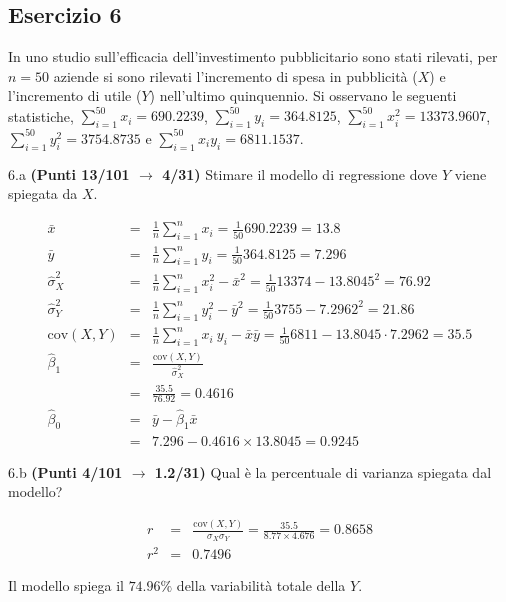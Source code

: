 \documentclass[
  11pt,
]{book}
\theoremstyle{mytheoremstyle}
\theoremstyle{mydefstyle}
\newenvironment{sol}
  {
  \begin{tcolorbox}[enhanced,breakable,arc=0.1mm,boxrule=1pt,colback=white,colframe=iblue,
  title=\bf \fontfamily{lmss}\selectfont \hspace{.5 cm} Soluzione,drop fuzzy shadow]

}{
\end{tcolorbox}
  }
\begin{document}
\subsection{Esercizio 6}\label{esercizio-6-24}

In uno studio sull'efficacia dell'investimento pubblicitario sono stati rilevati, per \(n=50\) aziende si sono rilevati l'incremento di spesa in
pubblicità (\(X\)) e l'incremento di utile (\(Y\)) nell'ultimo quinquennio. Si osservano le seguenti statistiche, \(\sum_{i=1}^{50}x_i=690.2239\), \(\sum_{i=1}^{50}y_i=364.8125\),
\(\sum_{i=1}^{50}x_i^2=13373.9607\), \(\sum_{i=1}^{50}y_i^2=3754.8735\) e \(\sum_{i=1}^{50}x_iy_i=6811.1537\).

6.a \textbf{(Punti 13/101 \(\rightarrow\) 4/31)} Stimare il modello di regressione dove \(Y\) viene spiegata da \(X\).

\begin{sol}
\begin{eqnarray*}
           \bar x &=&\frac 1 n\sum_{i=1}^n x_i = \frac {1}{ 50 }  690.2239 =  13.8 \\
           \bar y &=&\frac 1 n\sum_{i=1}^n y_i = \frac {1}{ 50 }  364.8125 =  7.296 \\
           \hat\sigma_X^2&=&\frac 1 n\sum_{i=1}^n x_i^2-\bar x^2=\frac {1}{ 50 }  13374  - 13.8045 ^2= 76.92 \\
           \hat\sigma_Y^2&=&\frac 1 n\sum_{i=1}^n y_i^2-\bar y^2=\frac {1}{ 50 }  3755  - 7.2962 ^2= 21.86 \\
           \text{cov}(X,Y)&=&\frac 1 n\sum_{i=1}^n x_i~y_i-\bar x\bar y=\frac {1}{ 50 }  6811 - 13.8045 \cdot 7.2962 = 35.5 \\
           \hat\beta_1 &=& \frac{\text{cov}(X,Y)}{\hat\sigma_X^2} \\
                    &=& \frac{ 35.5 }{ 76.92 }  =  0.4616 \\
           \hat\beta_0 &=& \bar y - \hat\beta_1 \bar x\\
                    &=&  7.296 - 0.4616 \times  13.8045 = 0.9245 
         \end{eqnarray*}

\end{sol}

6.b \textbf{(Punti 4/101 \(\rightarrow\) 1.2/31)} Qual è la percentuale di varianza spiegata dal modello?

\begin{sol}
\begin{eqnarray*}
r&=&\frac{\text{cov}(X,Y)}{\sigma_X\sigma_Y}=\frac{ 35.5 }{ 8.77 \times 4.676 }= 0.8658 \\ 
r^2&=& 0.7496\end{eqnarray*}

Il modello spiega il \(74.96\%\) della variabilità totale della \(Y\).

\end{sol}
\end{document}
